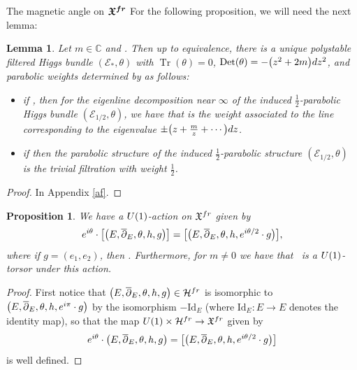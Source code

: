 \documentclass[11pt]{article}
\numberwithin{equation}{section}
\newtheorem{Lemma}[Theorem]{Lemma}
\newtheorem{Proposition}[Theorem]{Proposition}
 { \theoremstyle{definition}
\newtheorem{Definition}[Theorem]{Definition}
\newtheorem{Notation}[Theorem]{Notation}
\newtheorem{Example}[Theorem]{Example}
\newtheorem{Remark}[Theorem]{Remark} }
\numberwithin{equation}{section}
\begin{document}
\begin{subsubsection}{The magnetic angle on $\boldsymbol{\mathfrak{X}^{{\rm fr}}}$}
For the following proposition, we will need the next lemma:

\begin{Lemma} \label{UHB} Let $m\in \mathbb{C}$ and \smash{$m^{(3)}\in \bigl(-\frac12,\frac12\bigr] \subset \mathbb{R}$}. Then up to equivalence, there is a unique polystable filtered Higgs bundle $(\mathcal{E}_*,\theta)$ with $\operatorname{Tr}(\theta)=0$, $\operatorname{Det}(\theta)=-\bigl(z^2+2m\bigr){\rm d}z^2$, and parabolic weights determined by  as follows:
\begin{itemize}\itemsep=0pt
 \item if , then for the eigenline decomposition near $\infty$ of the induced $\frac12$-parabolic Higgs bundle $(\mathcal{E}_{1/2},\theta)$, we have that  is the weight associated to the line corresponding to the eigenvalue $\pm\bigl(z+\frac{m}{z}+\cdots \bigr){\rm d}z$.
 \item if  then the parabolic structure of the induced $\frac12$-parabolic structure $(\mathcal{E}_{1/2},\theta)$ is the trivial filtration with weight $\frac12$.
\end{itemize}
\end{Lemma}

\begin{proof}
In Appendix \ref{af}.
\end{proof}

\begin{Proposition}\label{U1A} We have a ${\rm U}(1)$-action on $\mathfrak{X}^{\textnormal{fr}}$ given by
 \begin{equation}\label{U(1)act}
 {\rm e}^{{\rm i}\theta}\cdot \bigl[\bigl(E,\overline{\partial}_E,\theta,h,g\bigr)\bigr]=\bigl[\bigl(E,\overline{\partial}_E,\theta,h,{\rm e}^{{\rm i}\theta/2}\cdot g\bigr)\bigr],
 \end{equation}
 where if $g=(e_1,e_2)$, then . Furthermore, for $m\neq 0$ we have that~ is a ${\rm U}(1)$-torsor under this action.
\end{Proposition}

\begin{proof}
First notice that $\bigl(E,\overline{\partial}_E,\theta,h,g\bigr)\in \mathcal{H}^{{\rm fr}}$ is isomorphic to $\bigl(E,\overline{\partial}_E,\theta,h,{\rm e}^{{\rm i}\pi}\cdot g\bigr)$ by the isomorphism $-\text{Id}_E$ (where $\text{Id}_E\colon E\to E$ denotes the identity map), so that the map ${\rm U}(1)\times \mathcal{H}^{{\rm fr}}\to \mathfrak{X}^{{\rm fr}}$ given by
\begin{equation*}
 {\rm e}^{{\rm i}\theta}\cdot \bigl(E,\overline{\partial}_E,\theta,h,g\bigr)=\bigl[\bigl(E,\overline{\partial}_E,\theta,h,{\rm e}^{{\rm i}\theta/2}\cdot g\bigr)\bigr]
\end{equation*}
is well defined.


\end{proof}
\end{subsubsection}
\end{document}
